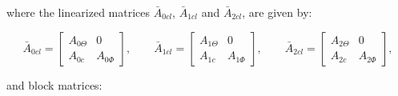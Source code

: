 \documentclass[main.tex]{subfiles}
\begin{document}
	where the linearized matrices $\bar{A}_{0cl}$, $\bar{A}_{1cl}$ and $\bar{A}_{2cl}$, are given by:
	
	\begin{equation*}
		\bar{A}_{0cl} = 
		\begin{bmatrix}
			A_{0\Theta} & 0 \\
			A_{0c} & A_{0\Phi}
		\end{bmatrix}, \qquad
		\bar{A}_{1cl} =
		\begin{bmatrix}
			A_{1\Theta} & 0 \\
			A_{1c} & A_{1\Phi}
		\end{bmatrix}, \qquad
		\bar{A}_{2cl} =
		\begin{bmatrix}
			A_{2\Theta} & 0 \\
			A_{2c} & A_{2\Phi}
		\end{bmatrix},
	\end{equation*}
	
	and block matrices:
	
\end{document}
